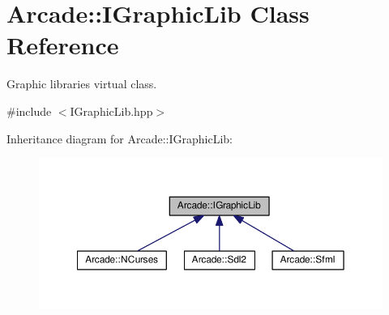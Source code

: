 \hypertarget{class_arcade_1_1_i_graphic_lib}{}\section{Arcade\+:\+:I\+Graphic\+Lib Class Reference}
\label{class_arcade_1_1_i_graphic_lib}


Graphic libraries virtual class.  




{\ttfamily \#include $<$I\+Graphic\+Lib.\+hpp$>$}



Inheritance diagram for Arcade\+:\+:I\+Graphic\+Lib\+:
\nopagebreak
\begin{figure}[H]
\begin{center}
\leavevmode
\includegraphics[width=350pt]{class_arcade_1_1_i_graphic_lib__inherit__graph}
\end{center}
\end{figure}
